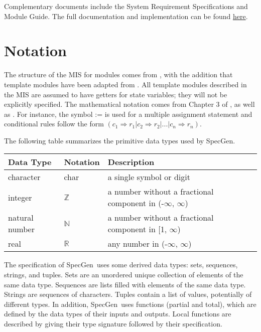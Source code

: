 \documentclass[12pt, titlepage]{article}
\newcommand{\progname}{SpecGen}
\begin{document}
Complementary documents include the System Requirement Specifications
and Module Guide.  The full documentation and implementation can be
found \href{https://github.com/palmerst/cas741_sp}{here}. 

\section{Notation}

The structure of the MIS for modules comes from \citet{HoffmanAndStrooper1995},
with the addition that template modules have been adapted from
\cite{GhezziEtAl2003}.  All template modules described in the MIS are assumed to
have getters for state variables; they will not be explicitly specified.
 The mathematical notation comes from Chapter 3 of
\citet{HoffmanAndStrooper1995}, as well as \cite{GS1993}.  For instance, the
symbol := is used for a multiple assignment statement and conditional rules
follow the form
$(c_1 \Rightarrow r_1 | c_2 \Rightarrow r_2 | ... | c_n \Rightarrow r_n )$.

The following table summarizes the primitive data types used by \progname. 

\begin{center}
\renewcommand{\arraystretch}{1.2}
\noindent 
\begin{tabular}{l l p{7.5cm}} 
\toprule 
\textbf{Data Type} & \textbf{Notation} & \textbf{Description}\\ 
\midrule
character & char & a single symbol or digit\\
integer & $\mathbb{Z}$ & a number without a fractional component in (-$\infty$, $\infty$) \\
natural number & $\mathbb{N}$ & a number without a fractional component in [1, $\infty$) \\
real & $\mathbb{R}$ & any number in (-$\infty$, $\infty$)\\
\bottomrule
\end{tabular} 
\end{center}

\noindent
The specification of \progname \ uses some derived data types: sets, sequences, strings, and
tuples. Sets are an unordered unique collection of elements of the same data type.  
Sequences are lists filled with elements of the same data type. Strings
are sequences of characters. Tuples contain a list of values, potentially of
different types. In addition, \progname \ uses functions (partial and total), which
are defined by the data types of their inputs and outputs. Local functions are
described by giving their type signature followed by their specification.\\
\end{document}
